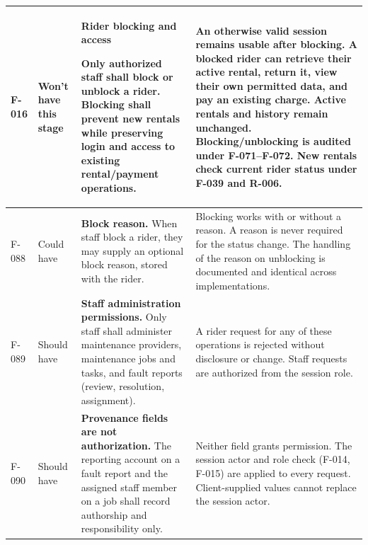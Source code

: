 \documentclass[10pt,a4paper,landscape]{article}
\newcommand{\reqtitle}[1]{{\fontsize{11}{13}\selectfont\bfseries #1}\par\nobreak\vspace{2pt}\noindent}
\begin{document}
\begin{longtable}{|C{27mm}|C{25mm}|L{79mm}|L{111mm}|}
\textbf{F-016} & Won't have this stage & \reqtitle{Rider blocking and access}Only authorized staff shall block or unblock a rider. Blocking shall prevent new rentals while preserving login and access to existing rental/payment operations. & An otherwise valid session remains usable after blocking. A blocked rider can retrieve their active rental, return it, view their own permitted data, and pay an existing charge. Active rentals and history remain unchanged. Blocking/unblocking is audited under F-071–F-072. New rentals check current rider status under F-039 and R-006. \\\hline
F-088 & Could have & \textbf{Block reason.} When staff block a rider, they may supply an optional block reason, stored with the rider. & Blocking works with or without a reason. A reason is never required for the status change. The handling of the reason on unblocking is documented and identical across implementations. \\ \hline
F-089 & Should have & \textbf{Staff administration permissions.} Only staff shall administer maintenance providers, maintenance jobs and tasks, and fault reports (review, resolution, assignment). & A rider request for any of these operations is rejected without disclosure or change. Staff requests are authorized from the session role. \\ \hline
F-090 & Should have & \textbf{Provenance fields are not authorization.} The reporting account on a fault report and the assigned staff member on a job shall record authorship and responsibility only. & Neither field grants permission. The session actor and role check (F-014, F-015) are applied to every request. Client-supplied values cannot replace the session actor. \\ \hline
\end{longtable}
\endgroup

\end{document}
